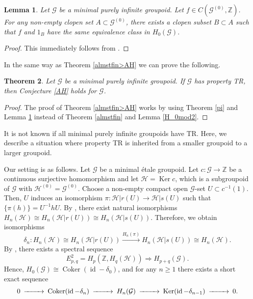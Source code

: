 \documentclass[11pt]{article}
\newtheorem{theorem}{Theorem}[section]
\newtheorem{lemma}[theorem]{Lemma}
\theoremstyle{definition}
\numberwithin{equation}{section}
\newcommand{\Coker}{\operatorname{Coker}}
\newcommand{\id}{\operatorname{id}}
\newcommand{\Ker}{\operatorname{Ker}}
\newcommand{\G}{\mathcal{G}}
\renewcommand{\H}{\mathcal{H}}
\newcommand{\Z}{\mathbb{Z}}
\begin{document}
\begin{lemma}\label{H_0ofpi}
Let $\G$ be a minimal purely infinite groupoid. 
Let $f\in C(\G^{(0)},\Z)$. 
For any non-empty clopen set $A\subset\G^{(0)}$, 
there exists a clopen subset $B\subset A$ 
such that $f$ and $1_B$ have the same equivalence class in $H_0(\G)$. 
\end{lemma}
\begin{proof}
This immediately follows 
from \cite[Lemma 5.3, Proposition 4.11]{M15crelle}. 
\end{proof}

In the same way as Theorem \ref{almstfin>AH} 
we can prove the following. 

\begin{theorem}\label{pi>AH}
Let $\G$ be a minimal purely infinite groupoid. 
If $\G$ has property TR, then 
Conjecture \ref{AH} holds for $\G$. 
\end{theorem}
\begin{proof}
The proof of Theorem \ref{almstfin>AH} works 
by using Theorem \ref{pi} and Lemma \ref{H_0ofpi} 
instead of Theorem \ref{almstfin} and Lemma \ref{H_0mod2}. 
\end{proof}

It is not known if all minimal purely infinite groupoids have TR. 
Here, we describe a situation 
where property TR is inherited from a smaller groupoid to a larger groupoid. 

Our setting is as follows. 
Let $\G$ be a minimal \'etale groupoid. 
Let $c:\G\to\Z$ be a continuous surjective homomorphism and 
let $\H=\Ker c$, 
which is a subgroupoid of $\G$ with $\H^{(0)}=\G^{(0)}$. 
Choose a non-empty compact open $\G$-set $U\subset c^{-1}(1)$. 
Then, $U$ induces an isomorphism $\pi:\H|r(U)\to\H|s(U)$ 
such that $\{\pi(h)\}=U^{-1}hU$. 
By \cite[Proposition 3.5, Theorem 3.6]{M12PLMS}, 
there exist natural isomorphisms 
$H_n(\H)\cong H_n(\H|r(U))\cong H_n(\H|s(U))$. 
Therefore, we obtain isomorphisms 
\[
\delta_n:H_n(\H)\cong H_n(\H|r(U))
\stackrel{H_n(\pi)}{\longrightarrow}H_n(\H|s(U))\cong H_n(\H). 
\]
By \cite[Proposition 3.7, Theorem 3.8]{M12PLMS}, 
there exists a spectral sequence 
\[
E^2_{p,q}=H_p(\Z,H_q(\H))\Rightarrow H_{p+q}(\G). 
\]
Hence, $H_0(\G)\cong\Coker(\id-\delta_0)$, 
and for any $n\geq1$ 
there exists a short exact sequence 
\begin{equation}
\begin{CD}
0@>>>\Coker(\id-\delta_n)@>>>H_n(\G)@>>>
\Ker(\id-\delta_{n-1})@>>>0. 
\end{CD}
\label{cow}
\end{equation}
\end{document}
